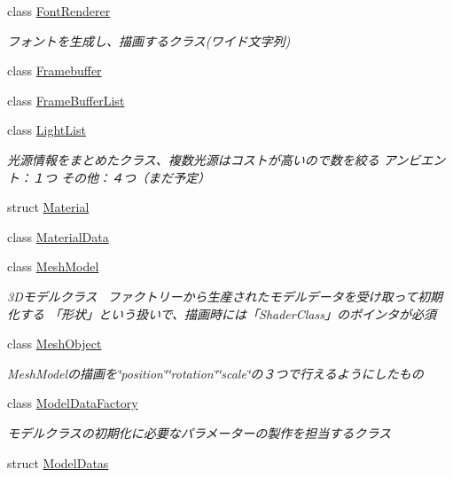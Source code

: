 \begin{DoxyCompactItemize}
\item 
class \mbox{\hyperlink{class_k___graphics_1_1_font_renderer}{Font\+Renderer}}
\begin{DoxyCompactList}\small\item\em フォントを生成し、描画するクラス(ワイド文字列) \end{DoxyCompactList}\item 
class \mbox{\hyperlink{class_k___graphics_1_1_framebuffer}{Framebuffer}}
\item 
class \mbox{\hyperlink{class_k___graphics_1_1_frame_buffer_list}{Frame\+Buffer\+List}}
\item 
class \mbox{\hyperlink{class_k___graphics_1_1_light_list}{Light\+List}}
\begin{DoxyCompactList}\small\item\em 光源情報をまとめたクラス、複数光源はコストが高いので数を絞る アンビエント：１つ その他：４つ（まだ予定） \end{DoxyCompactList}\item 
struct \mbox{\hyperlink{struct_k___graphics_1_1_material}{Material}}
\item 
class \mbox{\hyperlink{class_k___graphics_1_1_material_data}{Material\+Data}}
\item 
class \mbox{\hyperlink{class_k___graphics_1_1_mesh_model}{Mesh\+Model}}
\begin{DoxyCompactList}\small\item\em 3\+Dモデルクラス~\newline
ファクトリーから生産されたモデルデータを受け取って初期化する 「形状」という扱いで、描画時には「\+Shader\+Class」のポインタが必須 \end{DoxyCompactList}\item 
class \mbox{\hyperlink{class_k___graphics_1_1_mesh_object}{Mesh\+Object}}
\begin{DoxyCompactList}\small\item\em Mesh\+Modelの描画を\char`\"{}position\char`\"{}\char`\"{}rotation\char`\"{}\char`\"{}scale\char`\"{}の３つで行えるようにしたもの \end{DoxyCompactList}\item 
class \mbox{\hyperlink{class_k___graphics_1_1_model_data_factory}{Model\+Data\+Factory}}
\begin{DoxyCompactList}\small\item\em モデルクラスの初期化に必要なパラメーターの製作を担当するクラス \end{DoxyCompactList}\item 
struct \mbox{\hyperlink{struct_k___graphics_1_1_model_datas}{Model\+Datas}}

\end{DoxyCompactItemize}
